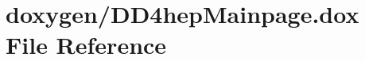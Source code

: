 \hypertarget{_d_d4hep_mainpage_8dox}{}\section{doxygen/\+D\+D4hep\+Mainpage.dox File Reference}
\label{_d_d4hep_mainpage_8dox}
